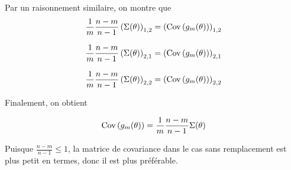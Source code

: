 \documentclass[a4paper,12pt]{article}
\begin{document}
Par un raisonnement similaire, on montre que
$$\frac{1}{m} \frac{n - m}{n - 1} \left( \Sigma(\theta) \right)_{1, 2} = \left({\rm Cov} \left( g_{m}(\theta) \right)\right)_{1, 2} $$

$$\frac{1}{m} \frac{n - m}{n - 1} \left( \Sigma(\theta) \right)_{2, 1} = \left({\rm Cov} \left( g_{m}(\theta) \right)\right)_{2, 1} $$

$$\frac{1}{m} \frac{n - m}{n - 1} \left( \Sigma(\theta) \right)_{2, 2} = \left({\rm Cov} \left( g_{m}(\theta) \right)\right)_{2, 2} $$

Finalement, on obtient

$$ {\rm Cov} \left( g_{m}(\theta) \right) = \frac{1}{m} \frac{n - m}{n - 1} \Sigma(\theta)$$

Puisque $\frac{n-m}{n-1} \le 1$, la matrice de covariance dans le cas sans remplacement est plus petit en termes, donc il est plus préférable.

	
\end{document}
